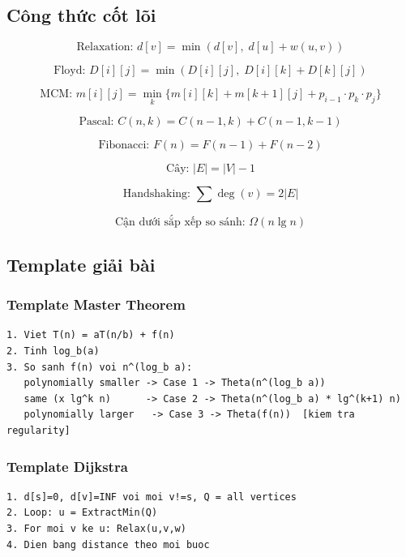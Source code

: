 \documentclass[10pt]{article}
\begin{document}
\subsection{Công thức cốt lõi}\label{cuxf4ng-thux1ee9c-cux1ed1t-luxf5i}

\[\text{Relaxation: } d[v] = \min(d[v],\; d[u] + w(u,v))\]

\[\text{Floyd: } D[i][j] = \min(D[i][j],\; D[i][k] + D[k][j])\]

\[\text{MCM: } m[i][j] = \min_k \{ m[i][k] + m[k+1][j] + p_{i-1} \cdot p_k \cdot p_j \}\]

\[\text{Pascal: } C(n,k) = C(n-1,k) + C(n-1,k-1)\]

\[\text{Fibonacci: } F(n) = F(n-1) + F(n-2)\]

\[\text{Cây: } |E| = |V| - 1\]

\[\text{Handshaking: } \sum \deg(v) = 2|E|\]

\[\text{Cận dưới sắp xếp so sánh: } \Omega(n \lg n)\]

\subsection{Template giải bài}\label{template-giux1ea3i-buxe0i}

\subsubsection{Template Master Theorem}\label{template-master-theorem}

\begin{tcolorbox}[colback=gray!8, colframe=gray!50, boxrule=0.5pt, arc=2pt,
  left=6pt, right=6pt, top=4pt, bottom=4pt,
  title={\small\textbf{Pseudocode 21: Template Master Theorem}}]
\begin{verbatim}
1. Viet T(n) = aT(n/b) + f(n)
2. Tinh log_b(a)
3. So sanh f(n) voi n^(log_b a):
   polynomially smaller -> Case 1 -> Theta(n^(log_b a))
   same (x lg^k n)      -> Case 2 -> Theta(n^(log_b a) * lg^(k+1) n)
   polynomially larger   -> Case 3 -> Theta(f(n))  [kiem tra regularity]
\end{verbatim}
\end{tcolorbox}

\subsubsection{Template Dijkstra}\label{template-dijkstra}

\begin{tcolorbox}[colback=gray!8, colframe=gray!50, boxrule=0.5pt, arc=2pt,
  left=6pt, right=6pt, top=4pt, bottom=4pt,
  title={\small\textbf{Pseudocode 22: Template Dijkstra}}]
\begin{verbatim}
1. d[s]=0, d[v]=INF voi moi v!=s, Q = all vertices
2. Loop: u = ExtractMin(Q)
3. For moi v ke u: Relax(u,v,w)
4. Dien bang distance theo moi buoc
\end{verbatim}
\end{tcolorbox}
\end{document}
